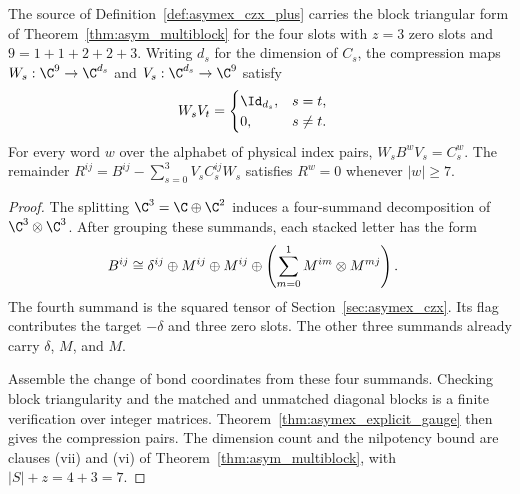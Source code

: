 \begin{theorem}
    \label{thm:asymex_czx_plus_compression}
    \leanok
    The source of Definition~\ref{def:asymex_czx_plus} carries the block
    triangular form of Theorem~\ref{thm:asym_multiblock} for the four
    slots with $z=3$ zero slots and $9=1+1+2+2+3$. Writing $d_s$ for
    the dimension of $C_s$, the compression maps
    $W_s:\C^9\to\C^{d_s}$ and $V_s:\C^{d_s}\to\C^9$ satisfy
    \begin{align}
        W_sV_t & =
        \begin{cases}
            \Id_{d_s}, & s=t,    \\
            0,         & s\ne t.
        \end{cases}
        \notag
    \end{align}
    For every word $w$ over the alphabet of physical index pairs,
    $W_sB^wV_s=C_s^w$. The remainder
    $R^{ij}=B^{ij}-\sum_{s=0}^3V_sC_s^{ij}W_s$ satisfies $R^w=0$
    whenever $|w|\geq7$.
\end{theorem}

\begin{proof}
    \leanok
    The splitting $\C^3=\C\oplus\C^2$ induces a four-summand
    decomposition of $\C^3\otimes\C^3$. After grouping these summands,
    each stacked letter has the form
    \begin{align}
        B^{ij} & \cong
        \delta^{ij}\oplus M^{ij}\oplus M^{ij}
        \oplus\left(\sum_{m=0}^1M^{im}\otimes M^{mj}\right).
        \notag
    \end{align}
    The fourth summand is the squared tensor of
    Section~\ref{sec:asymex_czx}. Its flag contributes the target
    $-\delta$ and three zero slots. The other three summands already
    carry $\delta$, $M$, and $M$.

    Assemble the change of bond coordinates from these four summands.
    Checking block triangularity and the matched and unmatched diagonal
    blocks is a finite verification over integer matrices.
    Theorem~\ref{thm:asymex_explicit_gauge} then gives the compression
    pairs. The dimension count and the nilpotency bound are clauses
    (vii) and (vi) of Theorem~\ref{thm:asym_multiblock}, with
    $|S|+z=4+3=7$.
\end{proof}

